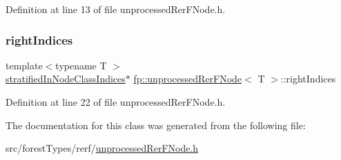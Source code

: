 Definition at line 13 of file unprocessed\+Rer\+F\+Node.\+h.

\mbox{\label{classfp_1_1unprocessedRerFNode_a4cc97ffcfe51937766fed926bbc4892a}} 
\subsubsection{\texorpdfstring{right\+Indices}{rightIndices}}
{\footnotesize\ttfamily template$<$typename T $>$ \\
\hyperlink{classfp_1_1stratifiedInNodeClassIndices}{stratified\+In\+Node\+Class\+Indices}$\ast$ \hyperlink{classfp_1_1unprocessedRerFNode}{fp\+::unprocessed\+Rer\+F\+Node}$<$ T $>$\+::right\+Indices\hspace{0.3cm}{\ttfamily [protected]}}



Definition at line 22 of file unprocessed\+Rer\+F\+Node.\+h.



The documentation for this class was generated from the following file\+:\begin{DoxyCompactItemize}
\item 
src/forest\+Types/rerf/\hyperlink{forestTypes_2rerf_2unprocessedRerFNode_8h}{unprocessed\+Rer\+F\+Node.\+h}\end{DoxyCompactItemize}
